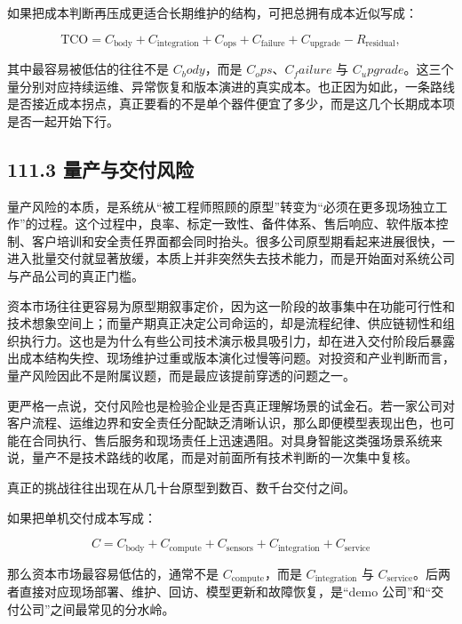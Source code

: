 如果把成本判断再压成更适合长期维护的结构，可把总拥有成本近似写成：

\begingroup
\scriptsize
\begin{equation*}
\text{TCO} = C_{\text{body}} + C_{\text{integration}} + C_{\text{ops}} + C_{\text{failure}} + C_{\text{upgrade}} - R_{\text{residual}},
\end{equation*}
\endgroup

其中最容易被低估的往往不是 \(C_body\)，而是 \(C_ops\)、\(C_failure\) 与 \(C_upgrade\)。这三个量分别对应持续运维、异常恢复和版本演进的真实成本。也正因为如此，一条路线是否接近成本拐点，真正要看的不是单个器件便宜了多少，而是这几个长期成本项是否一起开始下行。

\subsection*{111.3 量产与交付风险}


量产风险的本质，是系统从“被工程师照顾的原型”转变为“必须在更多现场独立工作”的过程。这个过程中，良率、标定一致性、备件体系、售后响应、软件版本控制、客户培训和安全责任界面都会同时抬头。很多公司原型期看起来进展很快，一进入批量交付就显著放缓，本质上并非突然失去技术能力，而是开始面对系统公司与产品公司的真正门槛。

资本市场往往更容易为原型期叙事定价，因为这一阶段的故事集中在功能可行性和技术想象空间上；而量产期真正决定公司命运的，却是流程纪律、供应链韧性和组织执行力。这也是为什么有些公司技术演示极具吸引力，却在进入交付阶段后暴露出成本结构失控、现场维护过重或版本演化过慢等问题。对投资和产业判断而言，量产风险因此不是附属议题，而是最应该提前穿透的问题之一。

更严格一点说，交付风险也是检验企业是否真正理解场景的试金石。若一家公司对客户流程、运维边界和安全责任分配缺乏清晰认识，那么即便模型表现出色，也可能在合同执行、售后服务和现场责任上迅速遇阻。对具身智能这类强场景系统来说，量产不是技术路线的收尾，而是对前面所有技术判断的一次集中复核。

真正的挑战往往出现在从几十台原型到数百、数千台交付之间。

如果把单机交付成本写成：

\begingroup
\scriptsize
\begin{equation*}
C = C_{\text{body}} + C_{\text{compute}} + C_{\text{sensors}} + C_{\text{integration}} + C_{\text{service}}
\end{equation*}
\endgroup

那么资本市场最容易低估的，通常不是 \(C_{\text{compute}}\)，而是 \(C_{\text{integration}}\) 与 \(C_{\text{service}}\)。后两者直接对应现场部署、维护、回访、模型更新和故障恢复，是“demo 公司”和“交付公司”之间最常见的分水岭。

